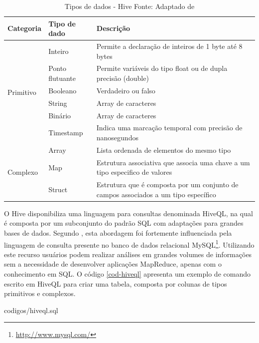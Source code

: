\begin{table}[!ht]
\begin{center}
  \begin{tabular}{|p{3cm}|p{4cm}|p{4cm}|}
  \hline
  Categoria & Tipo de dado & Descrição \\ 
  \hline
  \multirow{6}{*}{Primitivo} 
  & Inteiro 		& Permite a declaração de inteiros de 1 byte até 8 bytes \\ \cline{2-3} 
  & Ponto flutuante 	& Permite variáveis do tipo float ou de dupla precisão (double) \\ \cline{2-3}
  & Booleano		& Verdadeiro ou falso \\ \cline{2-3}
  & String 		& Array de caracteres \\ \cline{2-3}
  & Binário 		& Array de caracteres \\ \cline{2-3}
  & Timestamp 		& Indica uma marcação temporal com precisão de nanosegundos \\
  \hline
  \multirow{3}{*}{Complexo} 
  & Array 		& Lista ordenada de elementos do mesmo tipo \\ \cline{2-3} 
  & Map 		& Estrutura associativa que associa uma chave a um tipo especifico de valores \\ \cline{2-3}
  & Struct		& Estrutura que é composta por um conjunto de campos associados a um tipo específico \\
  \hline
  \end{tabular}
  \captionsetup{justification=centering}
  \caption[Tipos de dados - Hive ]{Tipos de dados - Hive
  \protect\linebreak Fonte: Adaptado de \cite{white2012}}
\label{tab-hive-types}
\end{center}
\end{table}
\FloatBarrier

O Hive disponibiliza uma linguagem para consultas denominada HiveQL, na qual é composta por um subconjunto do padrão SQL com adaptações para grandes bases de dados. Segundo , esta abordagem foi fortemente influenciada pela linguagem de consulta presente no banco de dados relacional MySQL\footnote{\url{http://www.mysql.com/}}. Utilizando este recurso usuários podem realizar análises em grandes volumes de informações sem a necessidade de desenvolver aplicações MapReduce, apenas com o conhecimento em SQL. O código \ref{cod-hiveql} apresenta um exemplo de comando escrito em HiveQL para criar uma tabela, composta por colunas de tipos primitivos e complexos.


		{codigos/hiveql.sql}
\FloatBarrier


